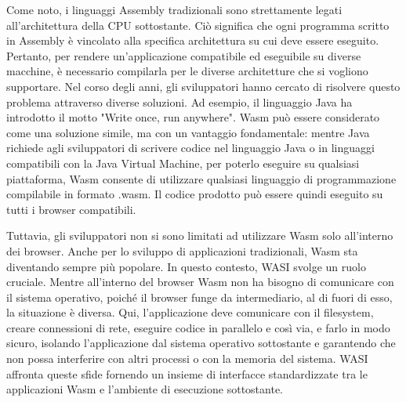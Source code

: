 \noindent
Come noto, i linguaggi Assembly tradizionali sono strettamente legati all'architettura della CPU sottostante. Ciò significa che ogni programma scritto in Assembly è vincolato alla specifica architettura su cui deve essere eseguito. Pertanto, per rendere un'applicazione compatibile ed eseguibile su diverse macchine, è necessario compilarla per le diverse architetture che si vogliono supportare.
Nel corso degli anni, gli sviluppatori hanno cercato di risolvere questo problema attraverso diverse soluzioni. Ad esempio, il linguaggio Java ha introdotto il motto "Write once, run anywhere". Wasm può essere considerato come una soluzione simile, ma con un vantaggio fondamentale: mentre Java richiede agli sviluppatori di scrivere codice nel linguaggio Java o in linguaggi compatibili con la Java Virtual Machine, per poterlo eseguire su qualsiasi piattaforma, Wasm consente di utilizzare qualsiasi linguaggio di programmazione compilabile in formato .wasm. Il codice prodotto può essere quindi eseguito su tutti i browser compatibili.

Tuttavia, gli sviluppatori non si sono limitati ad utilizzare Wasm solo all'interno dei browser. Anche per lo sviluppo di applicazioni tradizionali, Wasm sta diventando sempre più popolare. In questo contesto, WASI svolge un ruolo cruciale. Mentre all'interno del browser Wasm non ha bisogno di comunicare con il sistema operativo, poiché il browser funge da intermediario, al di fuori di esso, la situazione è diversa. Qui, l'applicazione deve comunicare con il filesystem, creare connessioni di rete, eseguire codice in parallelo e così via, e farlo in modo sicuro, isolando l'applicazione dal sistema operativo sottostante e garantendo che non possa interferire con altri processi o con la memoria del sistema. WASI affronta queste sfide fornendo un insieme di interfacce standardizzate tra le applicazioni Wasm e l'ambiente di esecuzione sottostante.

\clearpage
